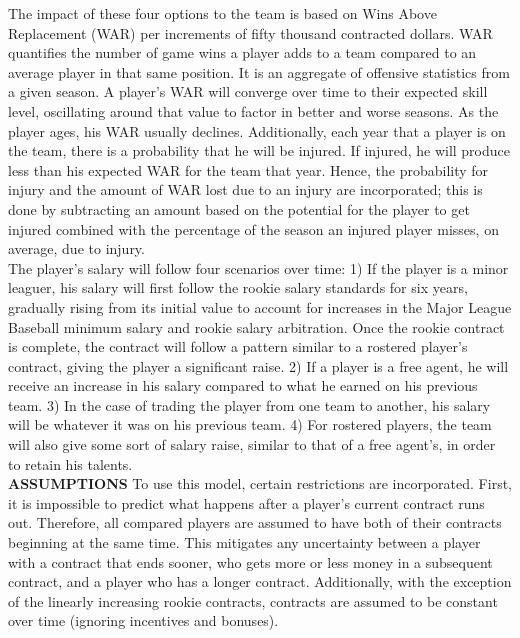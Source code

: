 \documentclass[12pt]{article}
\begin{document}
The impact of these four options to the team is based on Wins Above Replacement (WAR) per increments of fifty thousand contracted dollars.  WAR quantifies the number of game wins a player adds to a team compared to an average player in that same position.  It is an aggregate of offensive statistics from a given season.  A player's WAR will converge over time to their expected skill level, oscillating around that value to factor in better and worse seasons.  As the player ages, his WAR usually declines.  Additionally, each year that a player is on the team, there is a probability that he will be injured.  If injured, he will produce less than his expected WAR for the team that year.  Hence, the probability for injury and the amount of WAR lost due to an injury are incorporated; this is done by subtracting an amount based on the potential for the player to get injured combined with the percentage of the season an injured player misses, on average, due to injury.  \\

The player's salary will follow four scenarios over time: 1) If the player is a minor leaguer, his salary will first follow the rookie salary standards for six years, gradually rising from its initial value to account for increases in the Major League Baseball minimum salary and rookie salary arbitration.  Once the rookie contract is complete, the contract will follow a pattern similar to a rostered player's contract, giving the player a significant raise.  2) If a player is a free agent, he will receive an increase in his salary compared to what he earned on his previous team.  3) In the case of trading the player from one team to another, his salary will be whatever it was on his previous team.  4)  For rostered players, the team will also give some sort of salary raise, similar to that of a free agent's, in order to retain his talents.  \\
\vskip 2pt
\textbf{ASSUMPTIONS}
\vskip 2pt
To use this model, certain restrictions are incorporated.  First, it is impossible to predict what happens after a player's current contract runs out.  Therefore, all compared players are assumed to have both of their contracts beginning at the same time.  This mitigates any uncertainty between a player with a contract that ends sooner, who gets more or less money in a subsequent contract, and a player who has a longer contract. Additionally, with the exception of the linearly increasing rookie contracts, contracts are assumed to be constant over time (ignoring incentives and bonuses).  \\
\end{document}
